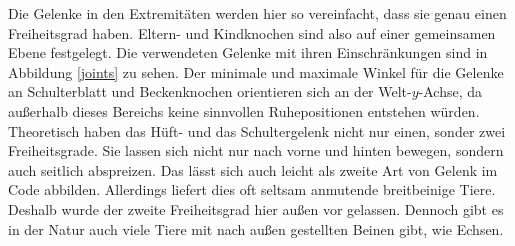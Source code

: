 Die Gelenke in den Extremitäten werden hier so vereinfacht, dass sie genau einen Freiheitsgrad haben. Eltern- und Kindknochen sind also auf einer gemeinsamen Ebene festgelegt. Die verwendeten Gelenke mit ihren Einschränkungen sind in Abbildung \ref{joints} zu sehen. Der minimale und maximale Winkel für die Gelenke an Schulterblatt und Beckenknochen orientieren sich an der Welt-$y$-Achse, da außerhalb dieses Bereichs keine sinnvollen Ruhepositionen entstehen würden. \\
Theoretisch haben das Hüft- und das Schultergelenk nicht nur einen, sonder zwei Freiheitsgrade. Sie lassen sich nicht nur nach vorne und hinten bewegen, sondern auch seitlich abspreizen. Das lässt sich auch leicht als zweite Art von Gelenk im Code abbilden. Allerdings liefert dies oft seltsam anmutende breitbeinige Tiere.
Deshalb wurde der zweite Freiheitsgrad hier außen vor gelassen.
Dennoch gibt es in der Natur auch viele Tiere mit nach außen gestellten Beinen gibt, wie \zb Echsen.


